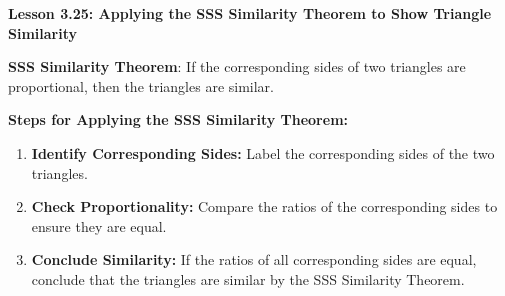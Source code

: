 \begin{center}
\textbf{Lesson 3.25: Applying the SSS Similarity Theorem to Show Triangle Similarity}
\end{center}

\vspace*{-1.5ex}

\noindent\textbf{SSS Similarity Theorem}: If the corresponding sides of two triangles are proportional, then the triangles are similar.

\noindent \textbf{Steps for Applying the SSS Similarity Theorem:}
\begin{enumerate}
    \item \textbf{Identify Corresponding Sides:} Label the corresponding sides of the two triangles.
    \item \textbf{Check Proportionality:} Compare the ratios of the corresponding sides to ensure they are equal.
    \item \textbf{Conclude Similarity:} If the ratios of all corresponding sides are equal, conclude that the triangles are similar by the SSS Similarity Theorem.
\end{enumerate}
